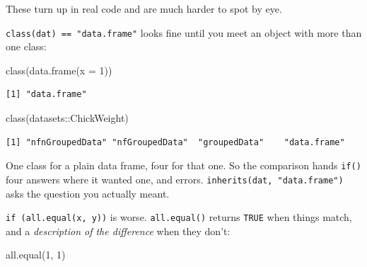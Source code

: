 \documentclass[
  letterpaper,
  justified,
  a4paper]{tufte-book}
\makeatletter
\newenvironment{Shaded}{\begin{snugshade}}{\end{snugshade}}
\newcommand{\AttributeTok}[1]{\textcolor[rgb]{0.40,0.45,0.13}{#1}}
\newcommand{\DecValTok}[1]{\textcolor[rgb]{0.68,0.00,0.00}{#1}}
\newcommand{\FunctionTok}[1]{\textcolor[rgb]{0.28,0.35,0.67}{#1}}
\newcommand{\NormalTok}[1]{\textcolor[rgb]{0.00,0.23,0.31}{#1}}
\newcommand{\SpecialCharTok}[1]{\textcolor[rgb]{0.37,0.37,0.37}{#1}}
\let\rbporigShaded\Shaded
\let\rbporigendShaded\endShaded
\renewenvironment{Shaded}{%
  \begingroup
  \ifdim\linewidth=\rbpbodywidth
    \advance\linewidth by \@tufte@overhang
    \advance\hsize by \@tufte@overhang
    \advance\columnwidth by \@tufte@overhang
  \fi
  \rbporigShaded
}{%
  \rbporigendShaded
  \endgroup
}
\makeatother
\begin{document}
\begin{tcolorbox}[enhanced jigsaw, arc=.35mm, bottomrule=.15mm, bottomtitle=1mm, breakable, colback=white, colbacktitle=quarto-callout-important-color!10!white, colframe=quarto-callout-important-color-frame, coltitle=black, left=2mm, leftrule=.75mm, opacityback=0, opacitybacktitle=0.6, rightrule=.15mm, title=\textcolor{quarto-callout-important-color}{\faExclamation}\hspace{0.5em}{Two nastier ones, for later}, titlerule=0mm, toprule=.15mm, toptitle=1mm]

These turn up in real code and are much harder to spot by eye.

\texttt{class(dat)\ ==\ "data.frame"} looks fine until you meet an
object with more than one class:

\begin{Shaded}
\begin{Highlighting}[]
\FunctionTok{class}\NormalTok{(}\FunctionTok{data.frame}\NormalTok{(}\AttributeTok{x =} \DecValTok{1}\NormalTok{))}
\end{Highlighting}
\end{Shaded}

\begin{verbatim}
[1] "data.frame"
\end{verbatim}

\begin{Shaded}
\begin{Highlighting}[]
\FunctionTok{class}\NormalTok{(datasets}\SpecialCharTok{::}\NormalTok{ChickWeight)}
\end{Highlighting}
\end{Shaded}

\begin{verbatim}
[1] "nfnGroupedData" "nfGroupedData"  "groupedData"    "data.frame"    
\end{verbatim}

One class for a plain data frame, four for that one. So the comparison
hands \texttt{if()} four answers where it wanted one, and errors.
\texttt{inherits(dat,\ "data.frame")} asks the question you actually
meant.

\texttt{if\ (all.equal(x,\ y))} is worse. \texttt{all.equal()} returns
\texttt{TRUE} when things match, and a \emph{description of the
difference} when they don't:

\begin{Shaded}
\begin{Highlighting}[]
\FunctionTok{all.equal}\NormalTok{(}\DecValTok{1}\NormalTok{, }\DecValTok{1}\NormalTok{)}
\end{Highlighting}
\end{Shaded}


\end{tcolorbox}
\end{document}
